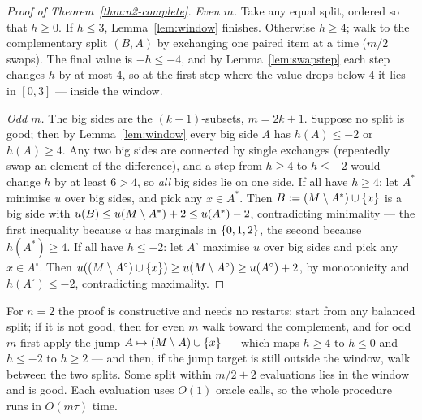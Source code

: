\begin{proof}[Proof of Theorem~\ref{thm:n2-complete}]
\emph{Even $m$.} Take any equal split, ordered so that $h \ge 0$. If
$h \le 3$, Lemma~\ref{lem:window} finishes. Otherwise $h \ge 4$; walk to the
complementary split $(B, A)$ by exchanging one paired item at a time
($m/2$ swaps). The final value is $-h \le -4$, and by
Lemma~\ref{lem:swapstep} each step changes $h$ by at most $4$, so at the first
step where the value drops below $4$ it lies in $[0, 3]$ ---
inside the window.

\emph{Odd $m$.} The big sides are the $(k{+}1)$-subsets, $m = 2k+1$. Suppose no
split is good; then by Lemma~\ref{lem:window} every big side $A$ has
$h(A) \le -2$ or $h(A) \ge 4$. Any two big sides are connected by single
exchanges (repeatedly swap an element of the difference), and a step from
$h \ge 4$ to $h \le -2$ would change $h$ by at least $6 > 4$, so \emph{all}
big sides lie on one side. If all have $h \ge 4$: let $A^*$ minimise $u$ over
big sides, and pick any $x \in A^*$. Then $B := (M \setminus A^*) \cup
\left\{x\right\}$ is a big side with $u(B) \le u(M \setminus A^*) + 2 \le
u(A^*) - 2$, contradicting minimality --- the first inequality because $u$ has
marginals in $\left\{0,1,2\right\}$, the second because $h(A^*) \ge 4$. If all have
$h \le -2$: let $A^\circ$ maximise $u$ over big sides and pick any
$x \in A^\circ$. Then $u((M \setminus A^\circ) \cup \left\{x\right\}) \ge
u(M \setminus A^\circ) \ge u(A^\circ) + 2$, by monotonicity and
$h(A^\circ) \le -2$, contradicting maximality.
\end{proof}

\begin{corollary}
\label{cor:n2-constructive}
For $n = 2$ the proof is constructive and needs no restarts: start from any
balanced split; if it is not good, then for even $m$ walk toward the
complement, and for odd $m$ first apply the jump $A \mapsto
(M \setminus A) \cup \left\{x\right\}$ --- which maps $h \ge 4$ to $h \le 0$ and
$h \le -2$ to $h \ge 2$ --- and then, if the jump target is still outside the
window, walk between the two splits. Some split within $m/2 + 2$ evaluations
lies in the window and is good. Each evaluation uses $O(1)$ oracle calls, so
the whole procedure runs in $O(m\tau)$ time.
\end{corollary}

